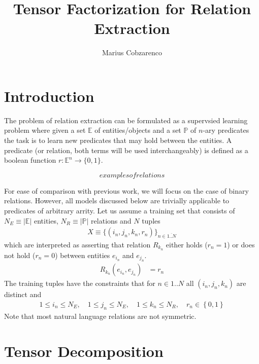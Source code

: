 \documentclass[a4paper, 11pt, fleqn]{article}
\begin{document}
 \title{Tensor Factorization for Relation Extraction}
\author{Marius Cobzarenco}
\maketitle

\section{Introduction}
The problem of relation extraction can be formulated as a supervsied
learning problem where given a set $\mathbb{E}$ of entities/objects
and a set $\mathbb{P}$ of $n$-ary predicates the task is to learn new
predicates that may hold between the entities. A predicate (or
relation, both terms will be used interchangeably) is defined as a
boolean function $r:\mathbb{E}^n \rightarrow \{0, 1\}$.

\[examples of relations\]

For ease of comparison with previous work, we will focus on the case
of binary relations. However, all models discussed below are trivially
applicable to predicates of arbitrary arrity. Let us assume a training
set that consists of $ N_E \equiv \vert\mathbb{E}\vert$ entities, $N_R
\equiv \vert\mathbb{P}\vert$ relations and $N$ tuples
\begin{align}
X \equiv \{(i_n, j_n, k_n, r_n)\}_{n\in\overline{1..N}}
\end{align}
which are interpreted as asserting that relation $R_{k_n}$ either
holds ($r_n = 1$) or does not hold ($r_n = 0$) between entities
$e_{i_n}$ and $e_{j_n}$.
\begin{align}
R_{k_n}(e_{i_n}, e_{j_n}) &= r_n
\end{align}
The training tuples have the constraints that for $n\in{1..N}$ all
$(i_n, j_n, k_n)$ are distinct and
\begin{align}
1 \leq i_n \leq N_E, \quad 1 \leq j_n \leq N_E, \quad
1 \leq k_n \leq N_R,\quad r_n \in \left\{0, 1\right\}
\end{align}
Note that most natural language relations are not symmetric.

\section{Tensor Decomposition}
\end{document}

